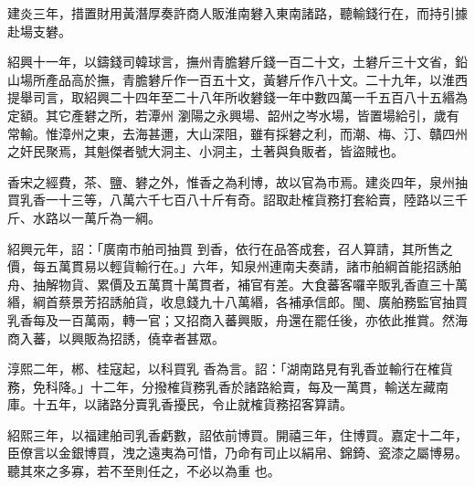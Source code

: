 \begin{pinyinscope}
 建炎三年，措置財用黃潛厚奏許商人販淮南礬入東南諸路，聽輸錢行在，而持引據赴場支礬。



 紹興十一年，以鑄錢司韓球言，撫州青膽礬斤錢一百二十文，土礬斤三十文省，鉛山場所產品高於撫，青膽礬斤作一百五十文，黃礬斤作八十文。二十九年，以淮西提舉司言，取紹興二十四年至二十八年所收礬錢一年中數四萬一千五百八十五緡為定額。其它產礬之所，若潭州
 瀏陽之永興場、韶州之岑水場，皆置場給引，歲有常輸。惟漳州之東，去海甚邇，大山深阻，雖有採礬之利，而潮、梅、汀、贛四州之奸民聚焉，其魁傑者號大洞主、小洞主，土著與負販者，皆盜賊也。



 香宋之經費，茶、鹽、礬之外，惟香之為利博，故以官為市焉。建炎四年，泉州抽買乳香一十三等，八萬六千七百八十斤有奇。詔取赴榷貨務打套給賣，陸路以三千斤、水路以一萬斤為一綱。



 紹興元年，詔：「廣南市舶司抽買
 到香，依行在品答成套，召人算請，其所售之價，每五萬貫易以輕貨輸行在。」六年，知泉州連南夫奏請，諸市舶綱首能招誘舶舟、抽解物貨、累價及五萬貫十萬貫者，補官有差。大食蕃客囉辛販乳香直三十萬緡，綱首蔡景芳招誘舶貨，收息錢九十八萬緡，各補承信郎。閩、廣舶務監官抽買乳香每及一百萬兩，轉一官；又招商入蕃興販，舟還在罷任後，亦依此推賞。然海商入蕃，以興販為招誘，僥幸者甚眾。



 淳熙二年，郴、桂寇起，以科買乳
 香為言。詔：「湖南路見有乳香並輸行在榷貨務，免科降。」十二年，分撥榷貨務乳香於諸路給賣，每及一萬貫，輸送左藏南庫。十五年，以諸路分賣乳香擾民，令止就榷貨務招客算請。



 紹熙三年，以福建舶司乳香虧數，詔依前博買。開禧三年，住博買。嘉定十二年，臣僚言以金銀博買，洩之遠夷為可惜，乃命有司止以絹帛、錦錡、瓷漆之屬博易。聽其來之多寡，若不至則任之，不必以為重
 也。



\end{pinyinscope}
